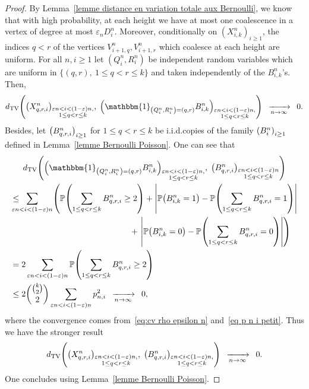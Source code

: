 \documentclass[AHL,Unicode,published]{cedram}
\newcommand{\e}{\varepsilon}
\newcommand{\cv}[1][n]{\enskip\xrightarrow[#1 \to \infty]{}\enskip}
\DeclareMathOperator{\TV}{TV}
\renewcommand{\P}{{\mathbb{P}}}
\newcommand{\1}{\mathbbm{1}}
\let\originalleft\left
\let\originalright\right
\renewcommand{\left}{\mathopen{}\mathclose\bgroup\originalleft}
\renewcommand{\right}{\aftergroup\egroup\originalright}
\renewcommand*{\to}{\mathchoice{\longrightarrow}{\rightarrow}{\rightarrow}{\rightarrow}}
\begin{document}
\begin{proof}
By Lemma~\ref{lemme distance en variation totale aux Bernoulli}, we know that with high probability, at each height we have at most one coalescence in a vertex of degree at most $\e_n D^n_i$. Moreover, conditionally on $(X^n_{i,k})_{i \ge 1}$, the indices $q<r$ of the vertices $V^n_{i+1,q}, V^n_{i+1,r}$ which coalesce at each height are uniform. For all $n,i\ge 1$ let $(Q^n_i,R^n_i)$ be independent random\pagebreak{} variables which are uniform in $\{(q,r), \ 1 \le q<r \le k\}$ and taken independently of the $B^n_{i,{k}}$'s. Then,
\[
d_{\TV}\left(
\left(X^n_{q,r,i}\right)_{\substack{\e n <i < (1-\e) n,\\ 1 \le q < r \le k}},\;
\left(\1_{\left(Q^n_i,R^n_i\right)=(q,r)}B^n_{i,{k}}\right)_{\substack{\e n <i < (1-\e) n,\\ 1 \le q < r \le k}}
\right)
\cv[n] 0.
\]
Besides, {let $\left(B^n_{q,r,i}\right)_{i\ge 1}$ for $1 \le q<r \le k$ be i.i.d.\@ copies of the family $\left(B^n_{i}\right)_{i\ge 1}$ defined in Lemma~\ref{lemme Bernoulli Poisson}}. One can see that
\begin{multline*}
d_{\TV} \left(
\left(\1_{\left(Q^n_i,R^n_i\right)=(q,r)}B^n_{i,{k}}\right)_{\substack{\e n <i < (1-\e) n,\\ 1 \le q < r \le k}},\;
\left(B^n_{q,r,i}\right)_{\substack{\e n <i < (1-\e) n\\ 1 \le q < r \le k}}
\right)\\
\begin{aligned}
&\le \!\!\!\!\!\!\!\sum_{\e n <i < (1-\e)n} \left(\P\left(\sum_{1 \le q<r\le k} B^n_{q,r,i} \ge 2\right) + \left| \P\left(B^n_{i,{k}} = 1\right) - \P\left(\sum_{1 \le q<r\le k} B^n_{q,r,i} = 1\right)\right| \right.\\
&\mkern258mu+ \left.\left| \P\left(B^n_{i,{k}} = 0\right) - \P\left(\sum_{1 \le q<r\le k} B^n_{q,r,i} = 0\right)\right|\right)\\
&= 2 \sum_{\e n < i <(1-\e) n}\P\left(\sum_{1 \le q<r\le k} B^n_{q,r,i} \ge 2\right)\\
&\le 2\binom{\binom{k}{2}}{2} \sum_{\e n < i <(1-\e)n} p_{n,i}^2\cv[n] 0,
\end{aligned}
\end{multline*}
where the convergence comes from~\eqref{eq:cv rho epsilon n} and~\eqref{eq p n i petit}. Thus we have the stronger result
\[
d_{\TV}\left(
\left(X^n_{q,r,i}\right)_{\substack{\e n <i < (1-\e) n,\\ 1 \le q < r \le k}},\;
\left(B^n_{q,r,i}\right)_{\substack{\e n <i < (1-\e) n,\\ 1 \le q < r \le k}}
\right)
\cv[n] 0.
\]
One concludes using Lemma~\ref{lemme Bernoulli Poisson}.
\end{proof}
\end{document}
